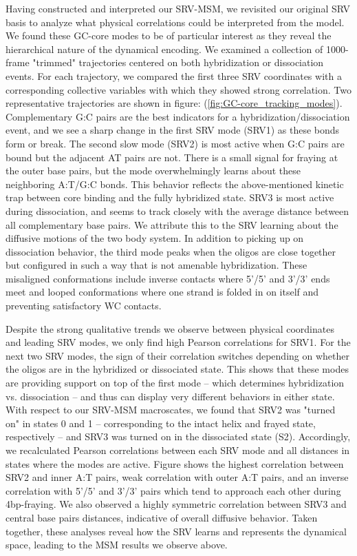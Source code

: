 \documentclass[journal=jpcbfk,manuscript=article]{achemso}
\begin{document}
Having constructed and interpreted our SRV-MSM, we revisited our original SRV basis to analyze what physical correlations could be interpreted from the model. We found these GC-core modes to be of particular interest as they reveal the hierarchical nature of the dynamical encoding. We examined a collection of 1000-frame "trimmed" trajectories centered on both hybridization or dissociation events. For each trajectory, we compared the first three SRV coordinates with a corresponding collective variables with which they showed strong correlation. Two representative trajectories are shown in figure: (\ref{fig:GC-core_tracking_modes}). Complementary G:C pairs are the best indicators for a hybridization/dissociation event, and we see a sharp change in the first SRV mode (SRV1) as these bonds form or break. The second slow mode (SRV2) is most active when G:C pairs are bound but the adjacent AT pairs are not. There is a small signal for fraying at the outer base pairs, but the mode overwhelmingly learns about these neighboring A:T/G:C bonds. This behavior reflects the above-mentioned kinetic trap between core binding and the fully hybridized state. SRV3 is most active during dissociation, and seems to track closely with the average distance between all complementary base pairs. We attribute this to the SRV learning about the diffusive motions of the two body system. In addition to picking up on dissociation behavior, the third mode peaks when the oligos are close together but configured in such a way that is not amenable hybridization. These misaligned conformations include inverse contacts where 5'/5' and 3'/3' ends meet and looped conformations where one strand is folded in on itself and preventing satisfactory WC contacts. 

Despite the strong qualitative trends we observe between physical coordinates and leading SRV modes, we only find high Pearson correlations for SRV1. For the next two SRV modes, the sign of their correlation switches depending on whether the oligos are in the hybridized or dissociated state. This shows that these modes are providing support on top of the first mode -- which determines hybridization vs. dissociation -- and thus can display very different behaviors in either state. With respect to our SRV-MSM macroscates, we found that SRV2 was "turned on" in states 0 and 1 -- corresponding to the intact helix and frayed state, respectively -- and SRV3 was turned on in the dissociated state (S2). Accordingly, we recalculated Pearson correlations between each SRV mode and all distances in states where the modes are active. Figure \label{fig:GC-core_tracking_modes} shows the highest correlation between SRV2 and inner A:T pairs, weak correlation with outer A:T pairs, and an inverse correlation with 5'/5' and 3'/3' pairs which tend to approach each other during 4bp-fraying. We also observed a highly symmetric correlation between SRV3 and central base pairs distances, indicative of overall diffusive behavior. Taken together, these analyses reveal how the SRV learns and represents the dynamical space, leading to the MSM results we observe above.
\end{document}
